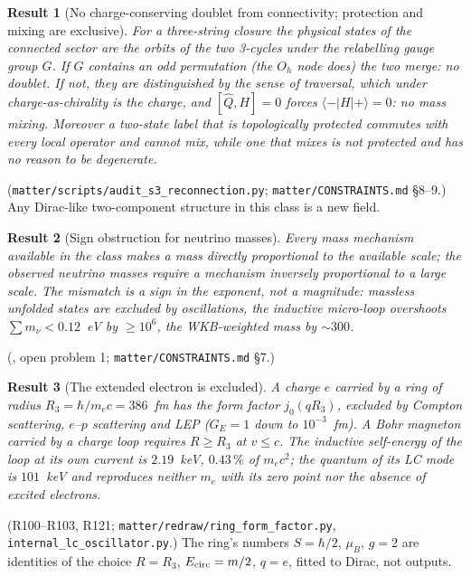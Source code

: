 \documentclass[11pt,a4paper]{article}
\newtheorem{prop}{Result}
\begin{document}
\begin{prop}[No charge-conserving doublet from connectivity; protection and mixing are exclusive]
For a three-string closure the physical states of the connected sector are the orbits of the two 3-cycles under the relabelling gauge group $G$. If $G$ contains an odd permutation (the $O_h$ node does) the two merge: no doublet. If not, they are distinguished by the sense of traversal, which under charge-as-chirality is the charge, and $[\hat Q, H] = 0$ forces $\langle -|H|+\rangle = 0$: no mass mixing. Moreover a two-state label that is topologically protected commutes with every local operator and cannot mix, while one that mixes is not protected and has no reason to be degenerate.
\end{prop}
\noindent(\texttt{matter/scripts/audit\_s3\_reconnection.py}; \texttt{matter/CONSTRAINTS.md} \S8--9.) Any Dirac-like two-component structure in this class is a new field.

\begin{prop}[Sign obstruction for neutrino masses]
Every mass mechanism available in the class makes a mass directly proportional to the available scale; the observed neutrino masses require a mechanism inversely proportional to a large scale. The mismatch is a sign in the exponent, not a magnitude: massless unfolded states are excluded by oscillations, the inductive micro-loop overshoots $\sum m_\nu < 0.12$~eV by $\ge 10^6$, the WKB-weighted mass by $\sim 300$.
\end{prop}
\noindent(\cite{ds_v210}, open problem 1; \texttt{matter/CONSTRAINTS.md} \S7.)

\begin{prop}[The extended electron is excluded]
A charge $e$ carried by a ring of radius $R_3 = \hbar/m_e c = 386$~fm has the form factor $j_0(qR_3)$, excluded by Compton scattering, $e$--$p$ scattering and LEP ($G_E = 1$ down to $10^{-3}$~fm). A Bohr magneton carried by a charge loop requires $R \ge R_3$ at $v \le c$. The inductive self-energy of the loop at its own current is $2.19$~keV, $0.43\,\%$ of $m_e c^2$; the quantum of its LC mode is $101$~keV and reproduces neither $m_e$ with its zero point nor the absence of excited electrons.
\end{prop}
\noindent(R100--R103, R121; \texttt{matter/redraw/ring\_form\_factor.py}, \texttt{internal\_lc\_oscillator.py}.) The ring's numbers $S = \hbar/2$, $\mu_B$, $g = 2$ are identities of the choice $R = R_3$, $E_{\rm circ} = m/2$, $q = e$, fitted to Dirac, not outputs.
\end{document}
